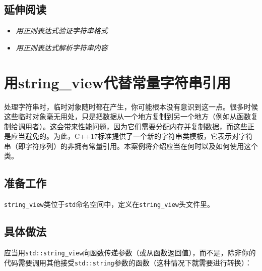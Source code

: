 
\subsection{延伸阅读}



\begin{itemize}
\item \textit{用正则表达式验证字符串格式}



\item \textit{用正则表达式解析字符串内容}

\end{itemize}



\section{用string\_view代替常量字符串引用}


处理字符串时，临时对象随时都在产生，你可能根本没有意识到这一点。很多时候这些临时对象毫无用处，只是把数据从一个地方复制到另一个地方（例如从函数复制给调用者）。这会带来性能问题，因为它们需要分配内存并复制数据，而这些正是应当避免的。为此，C++17标准提供了一个新的字符串类模板，它表示对字符串（即字符序列）的非拥有常量引用。本案例将介绍应当在何时以及如何使用这个类。



\subsection{准备工作}



\texttt{string\_\allowbreak{}view}类位于\texttt{std}命名空间中，定义在\texttt{string\_\allowbreak{}view}头文件里。



\subsection{具体做法}



应当用\texttt{std::\allowbreak{}string\_\allowbreak{}view}向函数传递参数（或从函数返回值），而不是，除非你的代码需要调用其他接受\texttt{std::\allowbreak{}string}参数的函数（这种情况下就需要进行转换）：


